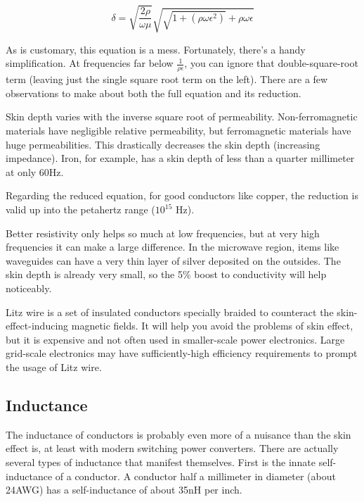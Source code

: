\begin{equation}
\delta = \sqrt{\frac{2\rho}{\omega\mu}}\sqrt{\sqrt{1+(\rho\omega\epsilon^2)}+\rho\omega\epsilon}
\label{skin_depth_eqn}
\end{equation}

As is customary, this equation is a mess. Fortunately, there's a handy simplification. At frequencies far below $\frac{1}{\rho\epsilon}$, you can ignore that double-square-root term  (leaving just the single square root term on the left). There are a few observations to make about both the full equation and its reduction.

Skin depth varies with the inverse square root of permeability. Non-ferromagnetic materials have negligible relative permeability, but ferromagnetic materials have huge permeabilities. This drastically decreases the skin depth (increasing impedance). Iron, for example, has a skin depth of less than a quarter millimeter at only 60Hz. 

Regarding the reduced equation, for good conductors like copper, the reduction is valid up into the petahertz range ($10^{15}$ Hz).

Better resistivity only helps so much at low frequencies, but at very high frequencies it can make a large difference. In the microwave region, items like waveguides can have a very thin layer of silver deposited on the outsides. The skin depth is already very small, so the 5\% boost to conductivity will help noticeably.	

Litz wire is a set of insulated conductors specially braided to counteract the skin-effect-inducing magnetic fields. It will help you avoid the problems of skin effect, but it is expensive and not often used in smaller-scale power electronics. Large grid-scale electronics may have sufficiently-high efficiency requirements to prompt the usage of Litz wire.

\subsection{Inductance}

The inductance of conductors is probably even more of a nuisance than the skin effect is, at least with modern switching power converters. There are actually several types of inductance that manifest themselves. First is the innate self-inductance of a conductor. A conductor half a millimeter in diameter (about 24AWG) has a self-inductance of about 35nH per inch.

